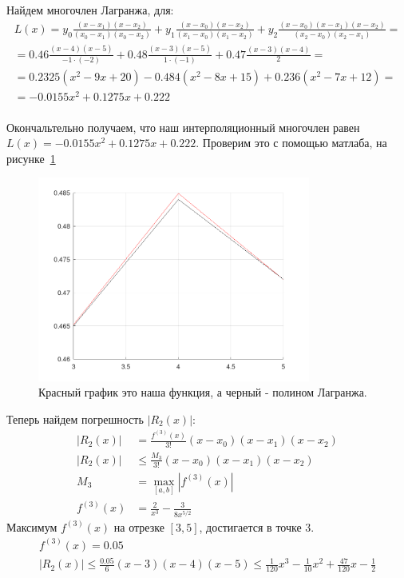 Найдем многочлен Лагранжа, для:
\begin{multline*}
  L(x) = y_{0} \frac{(x - x_{1})(x - x_{2})}{(x_{0} - x_{1})(x_{0} - x_{2})} + y_{1} \frac{(x - x_{0})(x - x_{2})}{(x_{1} - x_{0})(x_{1} - x_{2})} + y_{2} \frac{(x - x_{0})(x - x_{1})(x - x_{2})}{(x_{2} - x_{0})(x_{2} - x_{1})} = \\[3mm]
  = 0.46 \frac{(x - 4)(x - 5)}{-1 \cdot (-2)} + 0.48 \frac{(x - 3)(x-5)}{1 \cdot (-1)} + 0.47 \frac{(x - 3)(x-4)}{2} = \\[3mm]
  = 0.2325(x^{2}-9x+20) - 0.484(x^{2}-8x+15) + 0.236(x^{2}-7x+12) = \\[3mm]
  = -0.0155x^{2} + 0.1275x + 0.222
\end{multline*}\\[2mm]
Окончальтельно получаем, что наш интерполяционный многочлен равен $L(x) = -0.0155x^{2} + 0.1275x + 0.222$. Проверим это с помощью матлаба, на рисунке~\ref{fig:plot_5}

\begin{figure}
  \caption{Красный график это наша функция, а черный - полином Лагранжа.}
  \label{fig:plot_5}
  \centering
  \includegraphics[width=0.8\textwidth]{images/task_5.png}
\end{figure}

Теперь найдем погрешность $|R_{2}(x)|$:\\[2mm]
\begin{align*}
  |R_{2}(x)| &= \frac{f^{(3)}(x)}{3!}(x-x_{0})(x-x_{1})(x-x_{2}) \\[1mm]
  |R_{2}(x)| & \leq \frac{M_{3}}{3!}(x-x_{0})(x-x_{1})(x-x_{2}) \\[1mm]
  M_{3} &= \max_{\left[a, b\right]}|f^{(3)}(x)| \\[1mm]
  f^{(3)}(x) & = \frac{2}{x^{3}} - \frac{3}{8x^{5/2}}
\end{align*}
Максимум $f^{(3)}(x)$ на отрезке $[3, 5]$, достигается в точке $3$.
\begin{gather*}
  f^{(3)}(x) = 0.05 \\[1mm]
  |R_{2}(x)| \leq \frac{0.05}{6}(x-3)(x-4)(x-5) \leq \frac{1}{120}x^{3} - \frac{1}{10}x^{2} + \frac{47}{120}x - \frac{1}{2}
\end{gather*}

